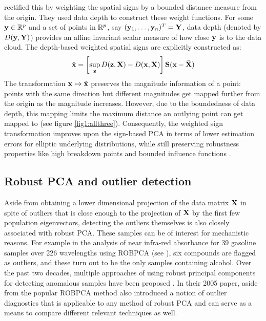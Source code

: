 \cite{Majumdar15} rectified this by weighting the spatial signs by a bounded distance measure from the origin. They used data depth \citep{zuo00} to construct these weight functions. For some ${\bf{y}} \in {\mathbb{R}}^p$ and a set of points in ${\mathbb{R}}^p$, say $({\bf{y}}_1, \ldots, {\bf{y}}_n)^T = {\mathbf{Y}}$, data depth (denoted by $D({\bf{y}}, {\mathbf{Y}})$) provides an affine invariant scalar measure of how close ${\bf{y}}$ is to the data cloud. The depth-based weighted spatial signs \citep{Majumdar15} are explicitly constructed as:
%
\begin{align}
\tilde {{\bf{x}}} = \left[ \sup_{{\bf{z}}} D({\bf{z}}, {\mathbf{X}}) - D({\bf{x}}, {\mathbf{X}}) \right] {\mathbf{S}}( {\bf{x}} - \bar {{\mathbf{X}}} )
\end{align}
%
The transformation ${\bf{x}} \mapsto \tilde {{\bf{x}}}$ preserves the magnitude information of a point: points with the same direction but different magnitudes get mapped further from the origin as the magnitude increases. However, due to the boundedness of data depth, this mapping limits the maximum distance an outlying point can get mapped to (see figure \ref{fig1:allthree}). Consequently, the weighted sign transformation improves upon the sign-based PCA in terms of lower estimation errors for elliptic underlying distributions, while still preserving robustness properties like high breakdown points and bounded influence functions \citep{Majumdar15}.

\subsection*{\sffamily \large Robust PCA and outlier detection}
Aside from obtaining a lower dimensional projection of the data matrix ${\mathbf{X}}$ in spite of outliers that is close enough to the projection of ${\mathbf{X}}$ by the first few population eigenvectors, detecting the outliers themselves is also closely associated with robust PCA. These samples can be of interest for mechanistic reasons. For example in the analysis of near infra-red absorbance for 39 gasoline samples over 226 wavelengths using ROBPCA (see \cite{hubert05}), six compounds are flagged as outliers, and these turn out to be the only samples containing alcohol. Over the past two decades, multiple approaches of using robust principal components for detecting anomalous samples have been proposed \citep{ShyuEtal03,JacksonChen04,BrownEtal10,PascoalEtal10}. In their 2005 paper, aside from the popular ROBPCA method \cite{hubert05} also introduced a notion of outlier diagnostics that is applicable to any method of robust PCA and can serve as a means to compare different relevant techniques as well.

